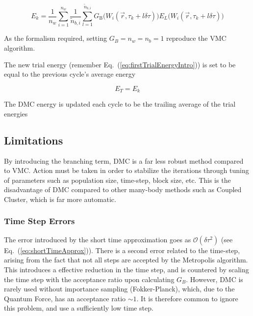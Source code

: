 \begin{equation}
 E_k = \frac{1}{n_w}\sum_{i=1}^{n_w} \frac{1}{\tilde n_{b,i}}\sum_{l=1}^{\tilde n_{b,i}} G_\mathrm{B}\Big(W_i(\vec r, \tau_k + l\delta\tau)\Big)E_L\Big(W_i(\vec r, \tau_k + l\delta\tau)\Big)
\end{equation}

As the formalism required, setting $G_B = n_w = n_b = 1$ reproduce the VMC algorithm. 

The new trial energy (remember Eq.~(\ref{eq:firstTrialEnergyIntro})) is set to be equal to the previous cycle's average energy  

\begin{equation}
 E_T = E_k
\end{equation}

The DMC energy is updated each cycle to be the trailing average of the trial energies





\subsection{Limitations}
\label{sec:DMClimitations}

By introducing the branching term, DMC is a far less robust method compared to VMC. Action must be taken in order to stabilize the iterations through tuning of parameters such as population size, time-step, block size, etc. This is the disadvantage of DMC compared to other many-body methods such as Coupled Cluster, which is far more automatic.

\subsubsection{Time Step Errors}

The error introduced by the short time approximation goes as $\mathcal{O}(\delta\tau^2)$ (see Eq.~(\ref{eq:shortTimeApprox})). There is a second error related to the time-step, arising from the fact that not all steps are accepted by the Metropolis algorithm. This introduces a effective reduction in the time step, and is countered by scaling the time step with the acceptance ratio upon calculating $G_B$. However, DMC is rarely used without importance sampling (Fokker-Planck), which, due to the Quantum Force, has an acceptance ratio $\sim 1$. It is therefore common to ignore this problem, and use a sufficiently low time step.

